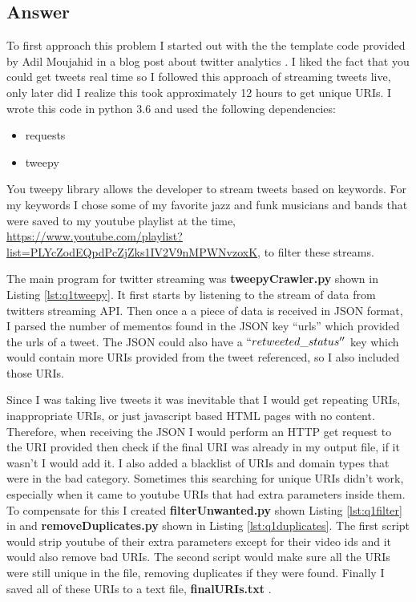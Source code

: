 \documentclass[letterpaper,11pt]{article}
\newcommand*{\srcPath}{../src}%
\begin{document}
\subsection*{Answer}

To first approach this problem I started out with the the template code provided by Adil Moujahid in a blog post about twitter analytics \cite{twitterstreamref}. I liked the fact that you could get tweets real time so I followed this approach of streaming tweets live, only later did I realize this took approximately 12 hours to get unique URIs. I wrote this code in python 3.6 and used the following dependencies:

\begin{itemize}
  \item requests
  \item tweepy
\end{itemize}

You tweepy library allows the developer to stream tweets based on keywords. For my keywords I chose some of my favorite jazz and funk musicians and bands that were saved to my youtube playlist at the time, \url{https://www.youtube.com/playlist?list=PLYcZodEQpdPcZjZks1IV2V9nMPWNvzoxK}, to filter these streams.

The main program for twitter streaming was \textbf{tweepyCrawler.py} shown in Listing \ref{lst:q1tweepy}. It first starts by listening to the stream of data from twitters streaming API. Then once a a piece of data is received in JSON format, I parsed the number of mementos found in the JSON key ``urls'' which provided the urls of a tweet. The JSON could also have a $``retweeted\char`_status''$ key which would contain more URIs provided from the tweet referenced, so I also included those URIs.



Since I was taking live tweets it was inevitable that I would get repeating URIs, inappropriate URIs, or just javascript based HTML pages with no content. Therefore, when receiving the JSON I would perform an HTTP get request to the URI provided then check if the final URI was already in my output file, if it wasn't I would add it. I also added a blacklist of URIs and domain types that were in the bad category. Sometimes this searching for unique URIs didn't work, especially when it came to youtube URIs that had extra parameters inside them. To compensate for this I created \textbf{filterUnwanted.py} shown Listing \ref{lst:q1filter} in and \textbf{removeDuplicates.py} shown in Listing \ref{lst:q1duplicates}. The first script would strip youtube of their extra parameters except for their video ids and it would also remove bad URIs. The second script would make sure all the URIs were still unique in the file, removing duplicates if they were found. Finally I saved all of these URIs to a text file, \textbf{finalURIs.txt} \cite{finalurisref}.
\end{document}
